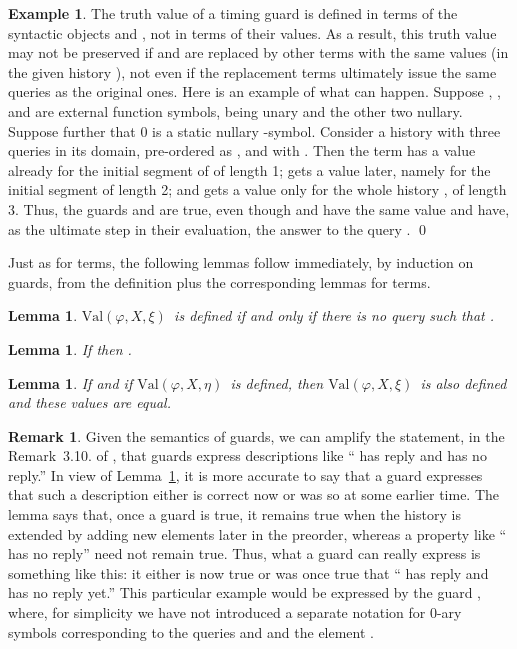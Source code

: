 \documentclass{LMCS}
\newtheorem{la}[thm]{Lemma}
\theoremstyle{definition}
\newtheorem{ex}[thm]{Example}
\newtheorem{rmk}[thm]{Remark}
\newcommand{\val}[3]{\ensuremath{\text{Val}(#1,#2,#3)}}
\renewcommand{\phi}{\varphi}
\begin{document}
\begin{ex}
The truth value of a timing guard  is defined in terms of
the syntactic objects  and , not in terms of their values.  As a
result, this truth value may not be preserved if  and  are replaced
by other terms with the same values (in the given history ), not even
if the replacement terms ultimately issue the same queries as the original
ones.  Here is an example of what can happen.  Suppose , , and 
are external function symbols,  being unary and the other two nullary.
Suppose further that 0 is a static nullary -symbol.  Consider a history
 with three queries in its domain, pre-ordered as , and with .  Then the
term  has a value already for the initial segment of  of length
1;  gets a value later, namely for the initial segment of length 2; and
 gets a value only for the whole history , of length 3.  Thus,
the guards  and  are true, even though
 and  have the same value and have, as the ultimate step in
their evaluation, the answer to the query .  \qed\end{ex}

Just as for terms, the following lemmas follow immediately, by
induction on guards, from the definition plus the corresponding lemmas
for terms.

\begin{la}   \label{df-noq-g}
  \val\phi X\xi\ is defined if and only if there is no query
 such that .
\end{la}

\begin{la}   \label{no-rep-g}
If  then .
\end{la}

\begin{la}   \label{mon-g}
If  and if \val\phi X\eta\ is defined, then \val\phi
  X\xi\ is also defined and these values are equal.
\end{la}

\begin{rmk}
  Given the semantics of guards, we can amplify the statement, in the
  Remark~3.10. of \cite{ga1}, that guards express descriptions like
  `` has reply  and  has no reply.''  In view of
  Lemma~\ref{mon-g}, it is more accurate to say that a guard expresses
  that such a description either is correct now or was so at some
  earlier time.  The lemma says that, once a guard is true, it remains
  true when the history is extended by adding new elements later in
  the preorder, whereas a property like `` has no reply'' need not
  remain true.  Thus, what a guard can really express is something
  like this: it either is now true or was once true that `` has
  reply  and  has no reply yet.''  This particular example
  would be expressed by the guard , where, for
  simplicity we have not introduced a separate notation for 0-ary
  symbols corresponding to the queries  and  and the element
  .
\end{rmk}
\end{document}
